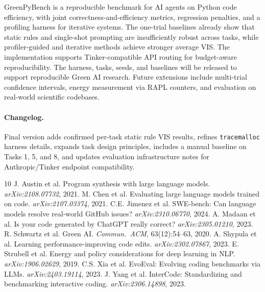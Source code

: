 \documentclass{article}
\begin{document}
GreenPyBench is a reproducible benchmark for AI agents on Python code efficiency, with joint correctness-and-efficiency metrics, regression penalties, and a profiling harness for iterative systems. The one-trial baselines already show that static rules and single-shot prompting are insufficiently robust across tasks, while profiler-guided and iterative methods achieve stronger average VIS. The implementation supports Tinker-compatible API routing for budget-aware reproducibility. The harness, tasks, seeds, and baselines will be released to support reproducible Green AI research. Future extensions include multi-trial confidence intervals, energy measurement via RAPL counters, and evaluation on real-world scientific codebases.

\paragraph{Changelog.} Final version adds confirmed per-task static rule VIS results, refines \texttt{tracemalloc} harness details, expands task design principles, includes a manual baseline on Tasks 1, 5, and 8, and updates evaluation infrastructure notes for Anthropic/Tinker endpoint compatibility.

\begin{thebibliography}{10}
 J. Austin et al. Program synthesis with large language models. \emph{arXiv:2108.07732}, 2021.
 M. Chen et al. Evaluating large language models trained on code. \emph{arXiv:2107.03374}, 2021.
 C.E. Jimenez et al. SWE-bench: Can language models resolve real-world GitHub issues? \emph{arXiv:2310.06770}, 2024.
 A. Madaan et al. Is your code generated by ChatGPT really correct? \emph{arXiv:2305.01210}, 2023.
 R. Schwartz et al. Green AI. \emph{Commun.\ ACM}, 63(12):54--63, 2020.
 A. Shypula et al. Learning performance-improving code edits. \emph{arXiv:2302.07867}, 2023.
 E. Strubell et al. Energy and policy considerations for deep learning in NLP. \emph{arXiv:1906.02629}, 2019.
 C.S. Xia et al. EvoEval: Evolving coding benchmarks via LLMs. \emph{arXiv:2403.19114}, 2023.
 J. Yang et al. InterCode: Standardizing and benchmarking interactive coding. \emph{arXiv:2306.14898}, 2023.
\end{thebibliography}
\end{document}
